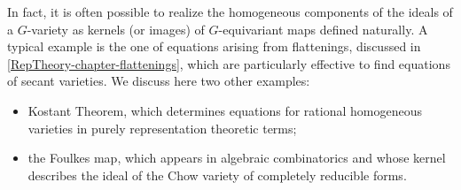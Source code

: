 In fact, it is often possible to realize the homogeneous components of the ideals of a $G$-variety as kernels (or images) of $G$-equivariant maps defined naturally.  A typical example is the one of equations arising from flattenings, discussed in \ref{RepTheory-chapter-flattenings}, which are particularly effective to find equations of secant varieties. We discuss here two other examples:
\begin{itemize}
 \item Kostant Theorem, which determines equations for rational homogeneous varieties in purely representation theoretic terms;
 \item the Foulkes map, which appears in algebraic combinatorics and whose kernel describes the ideal of the Chow variety of completely reducible forms.
\end{itemize}


